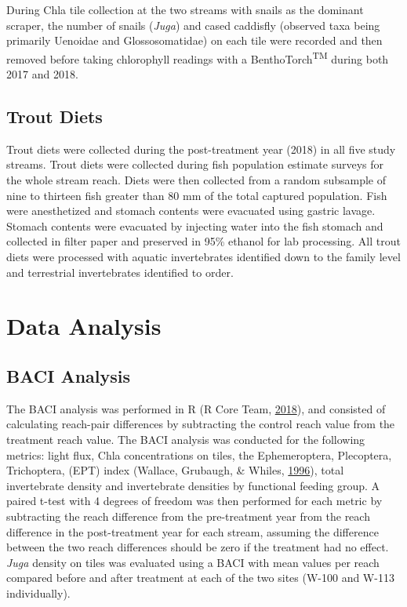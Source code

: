 \documentclass[double,12pt]{beavtex}
\begin{document}
  During Chla tile collection at the two streams with snails as the
  dominant scraper, the number of snails (\emph{Juga}) and cased caddisfly
  (observed taxa being primarily Uenoidae and Glossosomatidae) on each
  tile were recorded and then removed before taking chlorophyll readings
  with a BenthoTorch\textsuperscript{TM} during both 2017 and 2018.
  
  \subsection*{Trout Diets}\label{trout-diets}
  
  Trout diets were collected during the post-treatment year (2018) in all
  five study streams. Trout diets were collected during fish population
  estimate surveys for the whole stream reach. Diets were then collected
  from a random subsample of nine to thirteen fish greater than 80 mm of
  the total captured population. Fish were anesthetized and stomach
  contents were evacuated using gastric lavage. Stomach contents were
  evacuated by injecting water into the fish stomach and collected in
  filter paper and preserved in 95\% ethanol for lab processing. All trout
  diets were processed with aquatic invertebrates identified down to the
  family level and terrestrial invertebrates identified to order.
  
  \section*{Data Analysis}\label{data-analysis}
  
  \subsection*{BACI Analysis}\label{baci-analysis}
  
  The BACI analysis was performed in R (R Core Team,
  \protect\hyperlink{ref-R-base}{2018}), and consisted of calculating
  reach-pair differences by subtracting the control reach value from the
  treatment reach value. The BACI analysis was conducted for the following
  metrics: light flux, Chla concentrations on tiles, the Ephemeroptera,
  Plecoptera, Trichoptera, (EPT) index (Wallace, Grubaugh, \& Whiles,
  \protect\hyperlink{ref-Wallace1996}{1996}), total invertebrate density
  and invertebrate densities by functional feeding group. A paired t-test
  with 4 degrees of freedom was then performed for each metric by
  subtracting the reach difference from the pre-treatment year from the
  reach difference in the post-treatment year for each stream, assuming
  the difference between the two reach differences should be zero if the
  treatment had no effect. \emph{Juga} density on tiles was evaluated
  using a BACI with mean values per reach compared before and after
  treatment at each of the two sites (W-100 and W-113 individually).
  
\end{document}
